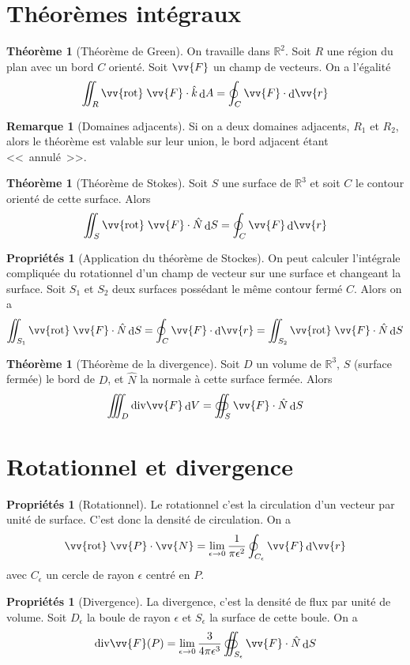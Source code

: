 \documentclass[11pt,a4paper]{article}
\theoremstyle{definition}
\newtheorem{myprop}[mydef]{Propriétés}
\newtheorem{myrem}[mydef]{Remarque}
\newtheorem{mytheo}[mydef]{Théorème}
\DeclareMathOperator{\diff}{d}
\newcommand{\dif}{\diff\!}
\renewcommand{\div}{\mathrm{div}}
\newcommand{\rot}{\vv{\mathrm{rot}}\;}
\newcommand{\R}{\mathbb{R}}
\begin{document}
\section{Théorèmes intégraux}

\begin{mytheo}[Théorème de Green]
	On travaille dans $\R^2$. Soit $R$ une région du plan avec un bord $C$ orienté. Soit $\vv{F}$ un champ de vecteurs. On a l'égalité
	\[ \iint_R \rot \vv{F} \cdot \hat{k} \dif A = \oint_C \vv{F} \cdot \dif \vv{r} \]
\end{mytheo}

\begin{myrem}[Domaines adjacents]
	Si on a deux domaines adjacents, $R_1$ et $R_2$, alors le théorème est valable sur leur union, le bord adjacent étant <<~annulé~>>.
\end{myrem}

\begin{mytheo}[Théorème de Stokes]
	Soit $S$ une surface de $\R^3$ et soit $C$ le contour orienté de cette surface. Alors
	\[ \iint_S \rot \vv{F} \cdot \hat{N} \dif S = \oint_C \vv{F} \dif \vv{r} \]
\end{mytheo}

\begin{myprop}[Application du théorème de Stockes]
	On peut calculer l'intégrale compliquée du rotationnel d'un champ de vecteur sur une surface et changeant la surface. Soit $S_1$ et $S_2$ deux surfaces possédant le même contour fermé $C$. Alors on a
	\[ \iint_{S_1} \rot \vv{F} \cdot \hat{N} \dif S = \oint_C \vv{F} \cdot \dif \vv{r} = \iint_{S_2} \rot \vv{F} \cdot \hat{N} \dif S \]
\end{myprop}

\begin{mytheo}[Théorème de la divergence]
	Soit $D$ un volume de $\R^3$, $S$ (surface fermée) le bord de $D$, et $\hat{N}$ la normale à cette surface fermée. Alors
	\[ \iiint_D \div \vv{F} \dif V = \oiint_S \vv{F} \cdot \hat{N} \dif S \]
\end{mytheo}

\section{Rotationnel et divergence}

\begin{myprop}[Rotationnel]
	Le rotationnel c'est la circulation d'un vecteur par unité de surface. C'est donc la densité de circulation. On a
	\[ \rot \vv{P} \cdot \vv{N} = \lim_{\epsilon \to 0} \frac 1{\pi \epsilon^2} \oint_{C_\epsilon} \vv{F} \dif \vv{r} \]
	avec $C_\epsilon$ un cercle de rayon $\epsilon$ centré en $P$.
\end{myprop}

\begin{myprop}[Divergence]
	La divergence, c'est la densité de flux par unité de volume. Soit $D_{\epsilon}$ la boule de rayon $\epsilon$ et $S_{\epsilon}$ la surface de cette boule. On a
	\[ \div \vv{F}(P) = \lim_{\epsilon \to 0} \frac{3}{4 \pi \epsilon^3} \oiint_{S_{\epsilon}} \vv{F} \cdot \hat{N} \dif S \]
\end{myprop}
\end{document}
